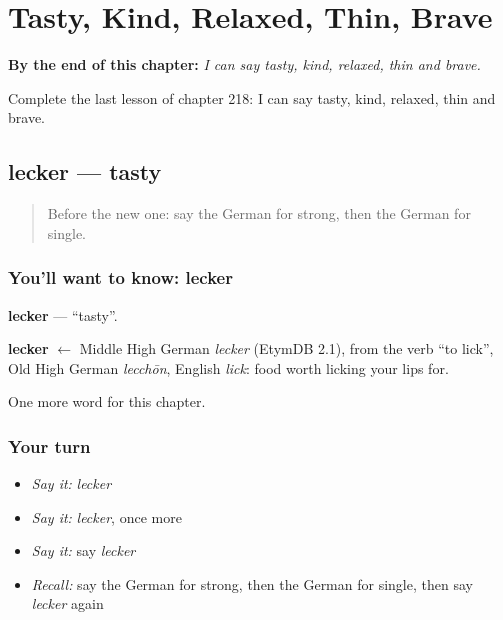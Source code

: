 
\chapter{Tasty, Kind, Relaxed, Thin, Brave}
\label{ch:ge-tasty-kind-relaxed-thin-brave}

\begin{chapteropening}
\textbf{By the end of this chapter:} \emph{I can say tasty, kind, relaxed, thin and brave.}

Complete the last lesson of chapter 218: I can say tasty, kind, relaxed, thin and brave.
\end{chapteropening}

\section[lecker]{lecker — tasty}

\label{lesson:GE-C218-lecker}



\begin{quote}
Before the new one: say the German for strong, then the German for single.
\end{quote}

\subsection*{You'll want to know: lecker}
\textbf{lecker} — \textquotedblleft{}tasty\textquotedblright{}.

\begin{cousinweb}
\textbf{lecker} $\leftarrow$ Middle High German \emph{lecker} (EtymDB 2.1), from the verb \textquotedblleft{}to lick\textquotedblright{}, Old High German \emph{lecchōn}, English \emph{lick}: food worth licking your lips for.
\end{cousinweb}

\begin{grammarlens}[title={What you've built}]
One more word for this chapter.
\end{grammarlens}

\subsection*{Your turn}
\begin{itemize}
\raggedright
  \item \emph{Say it:} \emph{lecker}
  \item \emph{Say it:} \emph{lecker}, once more
  \item \emph{Say it:} say \emph{lecker}
  \item \emph{Recall:} say the German for strong, then the German for single, then say \emph{lecker} again
\end{itemize}

